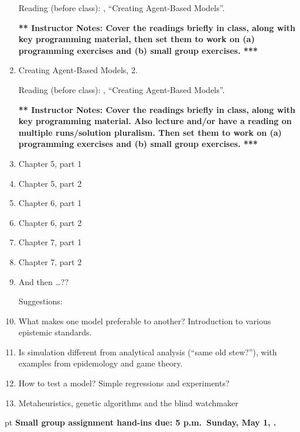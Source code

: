 \documentclass[11pt]{article}
\begin{document}
\begin{enumerate}
Reading (before class): \citep[chapter 4, pages 157--189]{wilensky_rand_2015},
``Creating Agent-Based Models''.

\ifnum{}
{\bf *** Instructor Notes: Cover the readings
  briefly in class, along with key programming material, then set them
  to work on (a) programming exercises and (b) small group exercises. ***}
\fi

\item Creating Agent-Based Models, 2.

Reading (before class): \citep[chapter 4, pages 189--197]{wilensky_rand_2015},
``Creating Agent-Based Models''.

\ifnum{}
{\bf *** Instructor Notes: Cover the readings
  briefly in class, along with key programming material. Also lecture
  and/or have a reading on multiple runs/solution pluralism.  Then set them
  to work on (a) programming exercises and (b) small group exercises. ***}
\fi

\item Chapter 5, part 1

\item Chapter 5, part 2

\item Chapter 6, part 1

\item Chapter 6, part 2

\item Chapter 7, part 1

\item Chapter 7, part 2

\item And then \ldots ??

Suggestions:
\item What makes one model preferable to another? Introduction to various epistemic standards.
\item Is simulation different from analytical analysis (``same old stew?''), with examples from epidemology and game theory.
\item How to test a model? Simple regressions and experiments?
\item Metaheuristics, genetic algorithms and the blind watchmaker

\end{enumerate}
 pt
{\bf Small group assignment hand-ins due: 5 p.m.\ Sunday, May 1, \year.} 


\end{document}
